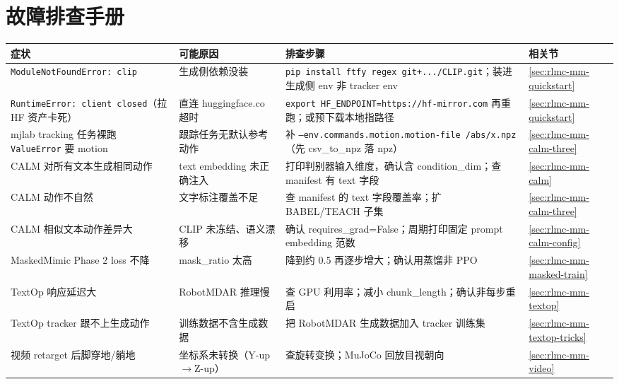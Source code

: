 \section*{故障排查手册}
\label{sec:rlmc-mm-troubleshoot}

\begin{center}
\small
\begin{tabular}{@{}p{3.4cm}p{3.0cm}p{4.4cm}l@{}}
\toprule
症状 & 可能原因 & 排查步骤 & 相关节 \\
\midrule
\texttt{ModuleNotFoundError: clip} & 生成侧依赖没装 & \texttt{pip install ftfy regex git+.../\allowbreak CLIP.\allowbreak git}；装进生成侧 env 非 tracker env & \cref{sec:rlmc-mm-quickstart} \\
\texttt{RuntimeError: client closed}（拉 HF 资产卡死） & 直连 huggingface.co 超时 & \texttt{export HF\_ENDPOINT=https:/\allowbreak /\allowbreak hf-mirror.\allowbreak com} 再重跑；或预下载本地指路径 & \cref{sec:rlmc-mm-quickstart} \\
mjlab tracking 任务裸跑 \texttt{ValueError} 要 motion & 跟踪任务无默认参考动作 & 补 \texttt{--env.\allowbreak commands.\allowbreak motion.\allowbreak motion-file /\allowbreak abs/\allowbreak x.\allowbreak npz}（先 csv\_to\_npz 落 npz） & \cref{sec:rlmc-mm-calm-three} \\
CALM 对所有文本生成相同动作 & text embedding 未正确注入 & 打印判别器输入维度，确认含 condition\_dim；查 manifest 有 text 字段 & \cref{sec:rlmc-mm-calm} \\
CALM 动作不自然 & 文字标注覆盖不足 & 查 manifest 的 text 字段覆盖率；扩 BABEL/TEACH 子集 & \cref{sec:rlmc-mm-calm-three} \\
CALM 相似文本动作差异大 & CLIP 未冻结、语义漂移 & 确认 requires\_grad=False；周期打印固定 prompt embedding 范数 & \cref{sec:rlmc-mm-calm-config} \\
MaskedMimic Phase 2 loss 不降 & mask\_ratio 太高 & 降到约 0.5 再逐步增大；确认用蒸馏非 PPO & \cref{sec:rlmc-mm-masked-train} \\
TextOp 响应延迟大 & RobotMDAR 推理慢 & 查 GPU 利用率；减小 chunk\_length；确认非每步重启 & \cref{sec:rlmc-mm-textop} \\
TextOp tracker 跟不上生成动作 & 训练数据不含生成数据 & 把 RobotMDAR 生成数据加入 tracker 训练集 & \cref{sec:rlmc-mm-textop-tricks} \\
视频 retarget 后脚穿地/躺地 & 坐标系未转换（Y-up$\to$Z-up） & 查旋转变换；MuJoCo 回放目视朝向 & \cref{sec:rlmc-mm-video} \\

\end{tabular}
\end{center}

